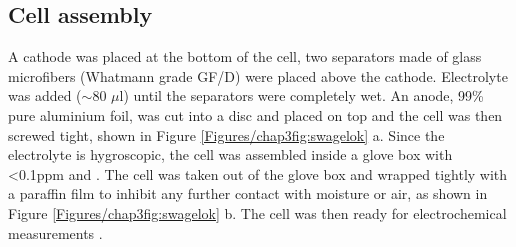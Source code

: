 \subsection*{Cell assembly} \label{cellass}
A cathode was placed at the bottom of the cell, two separators made of glass microfibers (Whatmann grade GF/D) were placed above the cathode. Electrolyte was added ($\sim$80 $\mu$l) until the separators were completely wet. An anode, 99\% pure aluminium foil, was cut into a disc and placed on top and the cell was then screwed tight, shown in Figure \ref{Figures/chap3fig:swagelok} a. Since the electrolyte is hygroscopic, the cell was assembled inside a glove box with <0.1ppm  and . The cell was taken out of the glove box and wrapped tightly with a paraffin film to inhibit any further contact with moisture or air, as shown in Figure \ref{Figures/chap3fig:swagelok} b. The cell was then ready for electrochemical measurements . 

